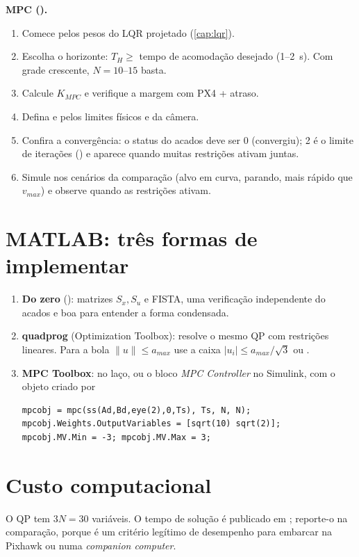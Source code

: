 \begin{receita}
\textbf{MPC ().}
\begin{enumerate}
  \item Comece pelos pesos do LQR projetado (\cref{cap:lqr}).
  \item Escolha o horizonte: $T_H \ge$ tempo de acomodação desejado (1--\SI{2}{s}).
        Com grade crescente, $N=10$--$15$ basta.
  \item Calcule $K_{MPC}$ e verifique a margem com PX4 + atraso.
  \item Defina  e  pelos limites físicos e da câmera.
  \item Confira a convergência: o status do acados deve ser 0 (convergiu); 2 é o limite de
        iterações () e aparece quando muitas restrições ativam juntas.
  \item Simule nos cenários da comparação (alvo em curva, parando, mais rápido que
        $v_{max}$) e observe quando as restrições ativam.
\end{enumerate}
\end{receita}

\section{MATLAB: três formas de implementar}
\begin{enumerate}
  \item \textbf{Do zero} (): matrizes $S_x,S_u$ e FISTA, uma
        verificação independente do acados e boa para entender a forma condensada.
  \item \textbf{quadprog} (Optimization Toolbox): resolve o mesmo QP com restrições
        lineares. Para a bola $\lVert u\rVert\le a_{max}$ use a caixa $|u_i|\le a_{max}/\sqrt3$
        ou .
  \item \textbf{MPC Toolbox}:  no laço, ou o bloco \emph{MPC Controller} no
        Simulink, com o objeto criado por
\begin{lstlisting}[basicstyle=\ttfamily\small]
mpcobj = mpc(ss(Ad,Bd,eye(2),0,Ts), Ts, N, N);
mpcobj.Weights.OutputVariables = [sqrt(10) sqrt(2)];
mpcobj.MV.Min = -3; mpcobj.MV.Max = 3;
\end{lstlisting}
\end{enumerate}

\section{Custo computacional}
O QP tem $3N=30$ variáveis. O tempo de solução é publicado em
; reporte-o na comparação, porque é um critério
legítimo de desempenho para embarcar na Pixhawk ou numa \emph{companion computer}.
